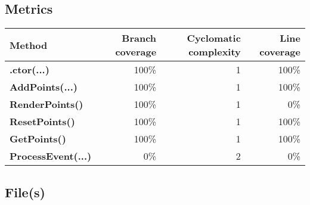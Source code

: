 \documentclass[a4paper,landscape,10pt]{article}
\begin{document}
\subsection{Metrics}
\begin{longtable}[l]{|l|r|r|r|}
\hline
\textbf{Method} & \textbf{Branch coverage} & \textbf{Cyclomatic complexity} & \textbf{Line coverage}\\
\hline
\textbf{.ctor(...)} & 100\% & 1 & 100\%\\
\hline
\textbf{AddPoints(...)} & 100\% & 1 & 100\%\\
\hline
\textbf{RenderPoints()} & 100\% & 1 & 0\%\\
\hline
\textbf{ResetPoints()} & 100\% & 1 & 100\%\\
\hline
\textbf{GetPoints()} & 100\% & 1 & 100\%\\
\hline
\textbf{ProcessEvent(...)} & 0\% & 2 & 0\%\\
\hline
\end{longtable}
\subsection{File(s)}
\end{document}
